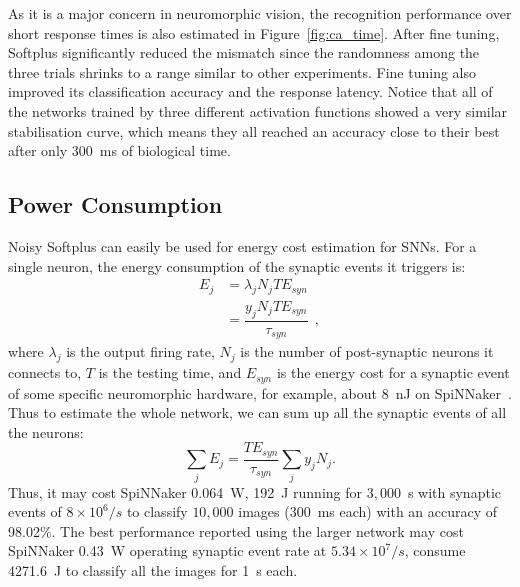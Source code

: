 	As it is a major concern in neuromorphic vision, the recognition performance over short response times is also estimated in Figure~\ref{fig:ca_time}.
	After fine tuning, Softplus significantly reduced the mismatch since the randomness among the three trials shrinks to a range similar to other experiments.
	Fine tuning also improved its classification accuracy and the response latency.
	Notice that all of the networks trained by three different activation functions showed a very similar stabilisation curve, which means they all reached an accuracy close to their best after only 300~ms of biological time. 
	
	
	\subsection{Power Consumption}
	Noisy Softplus can easily be used for energy cost estimation for SNNs.
	For a single neuron, the energy consumption of the synaptic events it triggers is:
	\begin{equation}
	\begin{aligned}
	E_{j} &= \lambda_j N_j T E_{syn}\\
	&= \dfrac{y_j N_j T E_{syn}}{\tau_{syn}}~~,
	\end{aligned}
	\label{equ:energy}
	\end{equation}
	where $\lambda_j$ is the output firing rate, $N_j$ is the number of post-synaptic neurons it connects to, $T$ is the testing time, and $E_{syn}$ is the energy cost for a synaptic event of some specific neuromorphic hardware, for example, about 8~nJ on SpiNNaker~\cite{stromatias2013power}.
	Thus to estimate the whole network, we can sum up all the synaptic events of all the neurons:
	\begin{equation}
	\sum_j E_{j} =  \dfrac{T E_{syn}}{\tau_{syn}} \sum_{j}y_j N_j.
	\end{equation}
	Thus, it may cost SpiNNaker 0.064~W, 192~J running for $3,000$~s with synaptic events of $8\times10^6/s$ to classify $10,000$ images (300~ms each) with an accuracy of 98.02\%.
	The best performance reported using the larger network may cost SpiNNaker 0.43~W operating synaptic event rate at $5.34\times10^7/s$, consume 4271.6~J to classify all the images for 1~s each.

